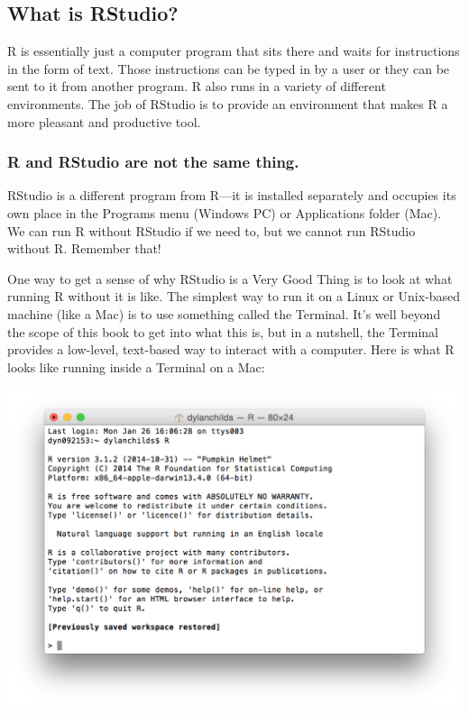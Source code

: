\documentclass[
]{book}
\newenvironment{greybox}{
  \definecolor{shadecolor}{rgb}{0.95,0.95,0.95}  %
  \color{black}
  \begin{shaded}}
 {\end{shaded}}
\newenvironment{infobox}[1]
  {
  \begin{itemize}
  \renewcommand{\labelitemi}{
    \raisebox{-.7\height}[0pt][0pt]{
      {\setkeys{Gin}{width=3em,keepaspectratio}
        \texttt{[image: images/\#1]}}
    }
  }
  \setlength{\fboxsep}{1em}
  \begin{greybox}
  \item
  }
  {
  \end{greybox}
  \end{itemize}
  }
\begin{document}
\hypertarget{what-is-rstudio}{%
\subsection*{What is RStudio?}\label{what-is-rstudio}}

R is essentially just a computer program that sits there and waits for instructions in the form of text. Those instructions can be typed in by a user or they can be sent to it from another program. R also runs in a variety of different environments. The job of RStudio is to provide an environment that makes R a more pleasant and productive tool.

\begin{infobox}{warning}

\hypertarget{r-and-rstudio-are-not-the-same-thing.}{%
\subsubsection*{R and RStudio are not the same thing.}\label{r-and-rstudio-are-not-the-same-thing.}}

RStudio is a different program from R---it is installed separately and occupies its own place in the Programs menu (Windows PC) or Applications folder (Mac). We can run R without RStudio if we need to, but we cannot run RStudio without R. Remember that!

\end{infobox}

One way to get a sense of why RStudio is a Very Good Thing is to look at what running R without it is like. The simplest way to run it on a Linux or Unix-based machine (like a Mac) is to use something called the Terminal. It's well beyond the scope of this book to get into what this is, but in a nutshell, the Terminal provides a low-level, text-based way to interact with a computer. Here is what R looks like running inside a Terminal on a Mac:

\includegraphics{images/R-terminal.png}
\end{document}

